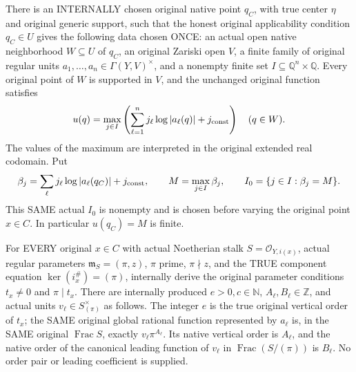 \begin{theorem}
\label{thm:gauss-common-original-convex-family}
\leanok
There is an INTERNALLY chosen original native point $q_C$, with true
center $\eta$ and original generic support, such that the honest original
applicability condition $q_C\in U$ gives the following data chosen ONCE:
an actual open native neighborhood $W\subseteq U$ of $q_C$, an original
Zariski open $V$, a finite family of original regular units
\(a_1,\ldots,a_n\in\Gamma(Y,V)^\times\), and a nonempty finite set
\(I\subseteq\mathbb Q^n\times\mathbb Q\). Every original point of $W$
is supported in $V$, and the unchanged original function satisfies
\[
 u(q)=\max_{j\in I}\left(\sum_{\ell=1}^n
       j_\ell\log|a_\ell(q)|+j_{\rm const}\right)
 \quad(q\in W).
\]
The values of the maximum are interpreted in the original extended real
co\-domain. Put
\[
 \beta_j=\sum_\ell j_\ell\log|a_\ell(q_C)|+j_{\rm const},\qquad
 M=\max_{j\in I}\beta_j,\qquad
 I_0=\{j\in I:\beta_j=M\}.
\]
This SAME actual $I_0$ is nonempty and is chosen before varying the
original point $x\in C$. In particular $u(q_C)=M$ is finite.

For EVERY original $x\in C$ with actual Noetherian stalk
$S=\mathcal O_{Y,i(x)}$, actual regular parameters
$\mathfrak m_S=(\pi,z)$, $\pi$ prime, $\pi\nmid z$, and the TRUE
component equation $\ker(i_x^\#)=(\pi)$, internally derive the original
parameter conditions $t_x\ne0$ and $\pi\mid t_x$.
There are internally produced $e>0,c\in\mathbb N$,
$A_\ell,B_\ell\in\mathbb Z$, and actual units
$v_\ell\in S_{(\pi)}^\times$ as follows. The integer $e$ is the true
original vertical order of $t_x$; the SAME original global rational
function represented by $a_\ell$ is, in the SAME original
$\operatorname{Frac}S$, exactly $v_\ell\pi^{A_\ell}$.
Its native vertical order is $A_\ell$, and the native order of the
canonical leading function of $v_\ell$ in
$\operatorname{Frac}(S/(\pi))$ is $B_\ell$.
No order pair or leading coefficient is supplied.


\end{theorem}
